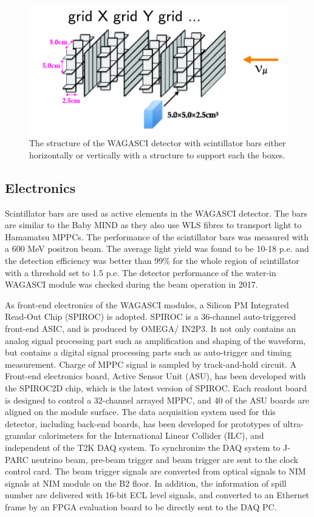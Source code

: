 \begin{figure}[h!]
\centering
\includegraphics[width=\textwidth]{figures/structure2.jpeg}
\caption{The structure of the WAGASCI detector with scintillator bars either horizontally or vertically with a structure to support each the boxes.}
\label{fig:StrucWAGASCI}
\end{figure}

\subsection{Electronics}

Scintillator bars are used as active elements in the WAGASCI detector. The bars are similar to the Baby MIND as they also use WLS fibres to transport light to Hamamatsu MPPCs. The performance of the scintillator bars was measured with a 600 MeV positron beam. The average light yield was found to be 10-18 p.e. and the detection efficiency was better than 99\% for the whole region of scintillator with a threshold set to 1.5 p.e.  The detector performance of the water-in WAGASCI module was checked during the beam operation in 2017.

As front-end electronics of the WAGASCI modules, a Silicon PM Integrated Read-Out Chip (SPIROC) is adopted.
SPIROC is a 36-channel auto-triggered front-end ASIC, and is produced by OMEGA/ IN2P3. 
It not only contains an analog signal processing part such as amplification and shaping of the waveform, but contains a digital signal processing parts such as auto-trigger and timing measurement.
Charge of MPPC signal is sampled by track-and-hold circuit.
A Front-end electronics board, Active Sensor Unit (ASU), has been developed with the SPIROC2D chip, which is the latest version of SPIROC. 
Each readout board is designed to control a 32-channel arrayed MPPC, and 40 of the ASU boards are aligned on the module surface. 
The data acquisition system used for this detector, including back-end boards, has been developed for prototypes of ultra-granular calorimeters for the International Linear Collider (ILC), and independent of the T2K DAQ system.
To synchronize the DAQ system to J- PARC neutrino beam, pre-beam trigger and beam trigger are sent to the clock control card.
The beam trigger signals are converted from optical signals to NIM signals at NIM module on the B2 floor.
In addition, the information of spill number are delivered with 16-bit ECL level signals, and converted to an Ethernet frame by an FPGA evaluation board to be directly sent to the DAQ PC.

